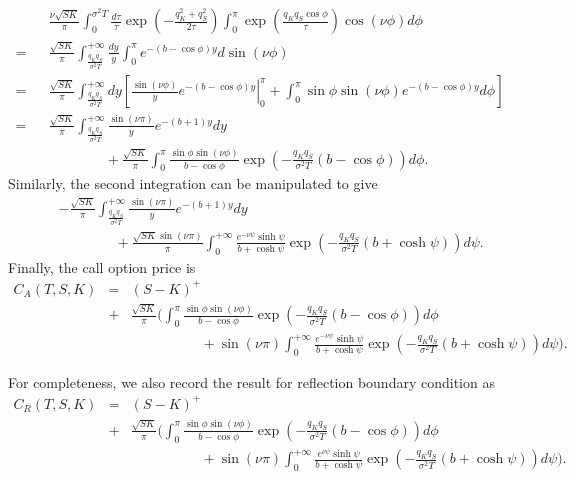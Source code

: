 \documentclass[12pt]{article}
\begin{document}
  \begin{eqnarray}
    && \frac{\nu\sqrt{SK}}{\pi}\int_0^{\sigma^2 T}\frac{d\tau}{\tau}\exp\left(-\frac{q_K^2+q_S^2}{2\tau}\right)
       \int_0^{\pi}\exp\left(\frac{q_Kq_S\cos\phi}{\tau}\right)\cos(\nu\phi)d\phi\nonumber\\
    = && \frac{\sqrt{SK}}{\pi}\int_{\frac{q_Kq_S}{\sigma^2 T}}^{+\infty}\frac{dy}{y}
       \int_0^{\pi}e^{-(b-\cos\phi)y}d\sin(\nu\phi)\nonumber\\
    = && \frac{\sqrt{SK}}{\pi}\int_{\frac{q_Kq_S}{\sigma^2 T}}^{+\infty}dy
         \left[\left.\frac{\sin(\nu\phi)}{y}e^{-(b-\cos\phi)y}\right|_0^{\pi}
              +\int_0^{\pi}\sin\phi\sin(\nu\phi)e^{-(b-\cos\phi)y}d\phi\right]\nonumber\\
    = && \frac{\sqrt{SK}}{\pi}\int_{\frac{q_Kq_S}{\sigma^2 T}}^{+\infty}\frac{\sin(\nu\pi)}{y}e^{-(b+1)y}dy\nonumber\\
      && \quad\quad\quad\quad+ \frac{\sqrt{SK}}{\pi}\int_0^{\pi}\frac{\sin\phi\sin(\nu\phi)}{b-\cos\phi}
       \exp\left(-\frac{q_Kq_S}{\sigma^2T}\left(b-\cos\phi\right)\right)d\phi.
  \end{eqnarray}
  Similarly, the second integration can be manipulated to give
  \begin{eqnarray}
    && -\frac{\sqrt{SK}}{\pi}\int_{\frac{q_Kq_S}{\sigma^2 T}}^{+\infty}\frac{\sin(\nu\pi)}{y}e^{-(b+1)y}dy\nonumber\\
      && \quad\quad\quad\quad+ \frac{\sqrt{SK}\sin(\nu\pi)}{\pi}\int_0^{+\infty}\frac{e^{-\nu \psi}\sinh \psi}{b+\cosh \psi}
       \exp\left(-\frac{q_Kq_S}{\sigma^2T}\left(b+\cosh \psi\right)\right)d\psi.
  \end{eqnarray}
  Finally, the call option price is
  \begin{eqnarray}
    C_A(T,S,K) &=& (S-K)^+ \nonumber\\
             &+&\frac{\sqrt{SK}}{\pi}\Bigg(\int_0^{\pi}\frac{\sin\phi\sin(\nu\phi)}{b-\cos\phi}
                        \exp\left(-\frac{q_Kq_S}{\sigma^2T}\left(b-\cos\phi\right)\right)d\phi\nonumber\\
             &&\quad\quad\quad\quad\quad + \sin(\nu\pi)\int_0^{+\infty}\frac{e^{-\nu \psi}\sinh \psi}{b+\cosh \psi}
       \exp\left(-\frac{q_Kq_S}{\sigma^2T}\left(b+\cosh \psi\right)\right)d\psi\Bigg).
    \label{CEVAbsorbingCall}
  \end{eqnarray}

  For completeness, we also record the result for reflection boundary condition as
  \begin{eqnarray}
    C_R(T,S,K) &=& (S-K)^+ \nonumber\\
             &+&\frac{\sqrt{SK}}{\pi}\Bigg(\int_0^{\pi}\frac{\sin\phi\sin(\nu\phi)}{b-\cos\phi}
                        \exp\left(-\frac{q_Kq_S}{\sigma^2T}\left(b-\cos\phi\right)\right)d\phi\nonumber\\
             &&\quad\quad\quad\quad\quad + \sin(\nu\pi)\int_0^{+\infty}\frac{e^{\nu \psi}\sinh \psi}{b+\cosh \psi}
       \exp\left(-\frac{q_Kq_S}{\sigma^2T}\left(b+\cosh \psi\right)\right)d\psi\Bigg).
  \end{eqnarray}
\end{document}
